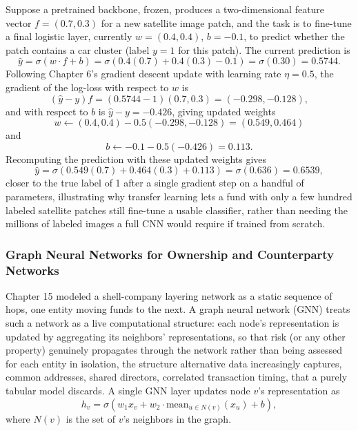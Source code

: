 \documentclass[../ai_in_finance]{subfiles}
\begin{document}
Suppose a pretrained backbone, frozen, produces a two-dimensional feature vector $f = (0.7, 0.3)$ for a new satellite image patch, and the task is to fine-tune a final logistic layer, currently $w = (0.4, 0.4)$, $b = -0.1$, to predict whether the patch contains a car cluster (label $y=1$ for this patch). The current prediction is
$$\hat y = \sigma(w \cdot f + b) = \sigma(0.4(0.7) + 0.4(0.3) - 0.1) = \sigma(0.30) = 0.5744.$$
Following Chapter 6's gradient descent update with learning rate $\eta = 0.5$, the gradient of the log-loss with respect to $w$ is
$$(\hat y - y)f = (0.5744-1)(0.7, 0.3) = (-0.298, -0.128),$$
and with respect to $b$ is $\hat y - y = -0.426$, giving updated weights
$$w \leftarrow (0.4, 0.4) - 0.5(-0.298,-0.128) = (0.549, 0.464)$$
and
$$b \leftarrow -0.1 - 0.5(-0.426) = 0.113.$$
Recomputing the prediction with these updated weights gives
$$\hat y = \sigma(0.549(0.7) + 0.464(0.3) + 0.113) = \sigma(0.636) = 0.6539,$$
closer to the true label of 1 after a single gradient step on a handful of parameters, illustrating why transfer learning lets a fund with only a few hundred labeled satellite patches still fine-tune a usable classifier, rather than needing the millions of labeled images a full CNN would require if trained from scratch.

\subsubsection*{Graph Neural Networks for Ownership and Counterparty Networks}

Chapter 15 modeled a shell-company layering network as a static sequence of hops, one entity moving funds to the next. A graph neural network (GNN) treats such a network as a live computational structure: each node's representation is updated by aggregating its neighbors' representations, so that risk (or any other property) genuinely propagates through the network rather than being assessed for each entity in isolation, the structure alternative data increasingly captures, common addresses, shared directors, correlated transaction timing, that a purely tabular model discards. A single GNN layer updates node $v$'s representation as
$$h_v = \sigma(w_1 x_v + w_2 \cdot \text{mean}_{u \in N(v)}(x_u) + b),$$
where $N(v)$ is the set of $v$'s neighbors in the graph.
\end{document}
